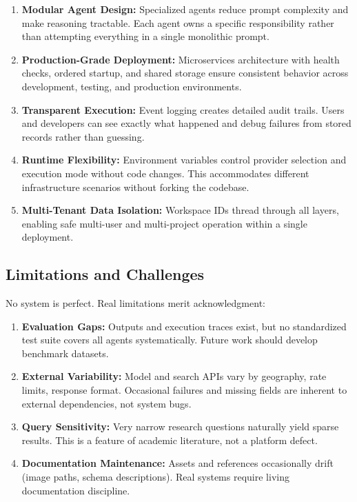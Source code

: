 \documentclass[12pt, a4paper]{article}
\begin{document}
\begin{enumerate}[label=\textbf{\alph*.}]
  \item \textbf{Modular Agent Design:} Specialized agents reduce prompt complexity and make
        reasoning tractable. Each agent owns a specific responsibility rather than attempting
        everything in a single monolithic prompt.
  \item \textbf{Production-Grade Deployment:} Microservices architecture with health checks,
        ordered startup, and shared storage ensure consistent behavior across development,
        testing, and production environments.
  \item \textbf{Transparent Execution:} Event logging creates detailed audit trails. Users
        and developers can see exactly what happened and debug failures from stored records
        rather than guessing.
  \item \textbf{Runtime Flexibility:} Environment variables control provider selection and
        execution mode without code changes. This accommodates different infrastructure
        scenarios without forking the codebase.
  \item \textbf{Multi-Tenant Data Isolation:} Workspace IDs thread through all layers,
        enabling safe multi-user and multi-project operation within a single deployment.
\end{enumerate}

\subsection{Limitations and Challenges}

No system is perfect. Real limitations merit acknowledgment:

\begin{enumerate}[label=\textbf{\alph*.}]
  \item \textbf{Evaluation Gaps:} Outputs and execution traces exist, but no standardized
        test suite covers all agents systematically. Future work should develop benchmark
        datasets.
  \item \textbf{External Variability:} Model and search APIs vary by geography, rate limits,
        response format. Occasional failures and missing fields are inherent to external
        dependencies, not system bugs.
  \item \textbf{Query Sensitivity:} Very narrow research questions naturally yield sparse
        results. This is a feature of academic literature, not a platform defect.
  \item \textbf{Documentation Maintenance:} Assets and references occasionally drift (image
        paths, schema descriptions). Real systems require living documentation discipline.
\end{enumerate}
\end{document}
